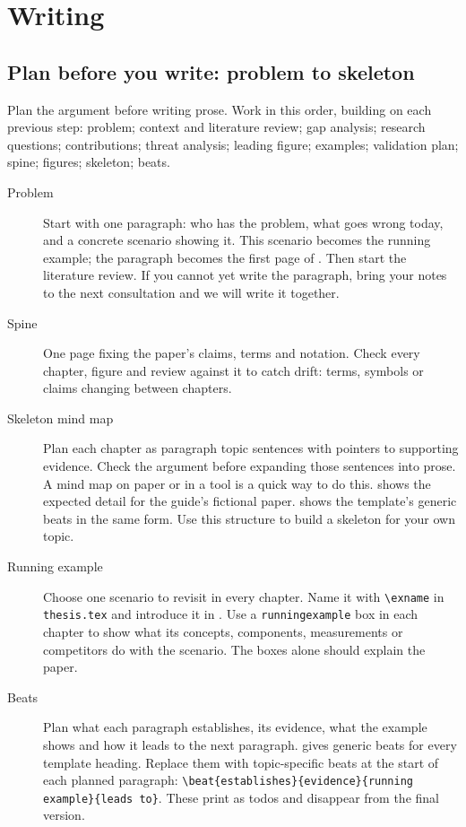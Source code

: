 \chapter{Writing}\label{app:writing}
\section{Plan before you write: problem to skeleton}\label{app:writing:spine}
Plan the argument before writing prose. Work in this order, building on each previous step: problem; context and literature review; gap analysis; research questions; contributions; threat analysis; leading figure; examples; validation plan; spine; figures; skeleton; beats.
\begin{description}
  \item[Problem] Start with one paragraph: who has the problem, what goes wrong today, and a concrete scenario showing it. This scenario becomes the running example; the paragraph becomes the first page of . Then start the literature review. If you cannot yet write the paragraph, bring your notes to the next consultation and we will write it together.
  \item[Spine] One page fixing the paper's claims, terms and notation. Check every chapter, figure and review against it to catch drift: terms, symbols or claims changing between chapters.
  \item[Skeleton mind map] Plan each chapter as paragraph topic sentences with pointers to supporting evidence. Check the argument before expanding those sentences into prose. A mind map on paper or in a tool is a quick way to do this.  shows the expected detail for the guide's fictional paper.  shows the template's generic beats in the same form. Use this structure to build a skeleton for your own topic.
  \item[Running example] Choose one scenario to revisit in every chapter. Name it with \texttt{\textbackslash exname} in \texttt{thesis.tex} and introduce it in . Use a \texttt{runningexample} box in each chapter to show what its concepts, components, measurements or competitors do with the scenario. The boxes alone should explain the paper.
  \item[Beats] Plan what each paragraph establishes, its evidence, what the example shows and how it leads to the next paragraph.  gives generic beats for every template heading. Replace them with topic-specific beats at the start of each planned paragraph: \texttt{\textbackslash beat\{establishes\}\{evidence\}\{running example\}\{leads to\}}. These print as todos and disappear from the final version.
\end{description}

